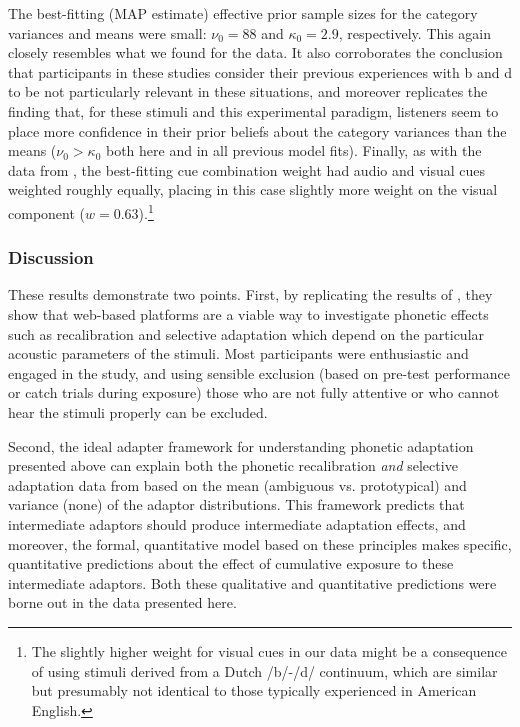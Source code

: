 The best-fitting (MAP estimate) effective prior sample sizes for the category variances and means were small: $\nu_0 = 88$ and $\kappa_0=2.9$, respectively.  This again closely resembles what we found for the \textcite{Vroomen2007} data.  It also corroborates the conclusion that participants in these studies consider their previous experiences with \ph b and \ph d to be not particularly relevant in these situations, 
and moreover replicates the finding that, for these stimuli and this experimental paradigm, listeners seem to place more confidence in their prior beliefs about the category variances than the means ($\nu_0 > \kappa_0$ both here and in all previous model fits).  Finally, as with the data from \textcite{Vroomen2007}, the best-fitting cue combination weight had audio and visual cues weighted roughly equally, placing in this case slightly more weight on the visual component ($w=0.63$).\footnote{The slightly higher weight for visual cues in our data might be a consequence of using stimuli derived from a Dutch /b/-/d/ continuum, which are similar but presumably not identical to those typically experienced in American English.}

\subsubsection{Discussion}
\label{sec:discussion-3}

These results demonstrate two points.  First, by replicating the results of \textcite{Vroomen2007}, they show that web-based platforms are a viable way to investigate phonetic effects such as recalibration and selective adaptation which depend on the particular acoustic parameters of the stimuli.  Most participants were enthusiastic and engaged in the study, and using sensible exclusion (based on pre-test performance or catch trials during exposure) those who are not fully attentive or who cannot hear the stimuli properly can be excluded.

Second, the ideal adapter framework for understanding phonetic adaptation presented above can explain both the phonetic recalibration \emph{and} selective adaptation data from \textcite{Vroomen2007} based on the mean (ambiguous vs. prototypical) and variance (none) of the adaptor distributions.  This framework predicts that intermediate adaptors should produce intermediate adaptation effects, and moreover, the formal, quantitative model based on these principles makes specific, quantitative predictions about the effect of cumulative exposure to these intermediate adaptors.  Both these qualitative and quantitative predictions were borne out in the data presented here.

